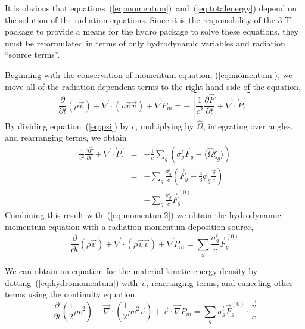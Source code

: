 \documentclass[12pt]{article}
\newcommand{\partl}[2]{\ensuremath{\frac{\partial{#1}}{\partial{#2}}}}\newcommand{\del}{\ensuremath{\vec{\nabla}}}
\newcommand{\tensor}[1]{\ensuremath{\stackrel{\leftrightarrow}{#1}}}
\begin{document}
It is obvious that equations~(\ref{eq:momentum})~and~(\ref{eq:totalenergy})
depend on the solution of the radiation equations.
Since it is the responsibility of the 3-T package to provide a means for
the hydro package to solve these equations, they must be reformulated
in terms of only hydrodynamic variables and radiation ``source terms''.

Beginning with the conservation of momentum equation, (\ref{eq:momentum}),
we move all of the radiation dependent terms to the right hand side of the
equation,
\begin{equation}
   \partl{}{t}\left( \rho \vec{v}\right)
      + \del \cdot \left( \rho \vec{v} \vec{v} \right)
      + \del P_{m}
   =
   - \left[ \frac{1}{c^2} \partl{\vec{F}}{t}
            + \del \cdot \tensor{P_{r}}
     \right]
\label{eq:momentum2}
\end{equation}
By dividing equation~(\ref{eq:psi}) by $c$, multiplying by $\hat{\Omega}$,
integrating over angles, and rearranging terms, we obtain
\begin{eqnarray}
   \frac{1}{c^2} \partl{\vec{F}}{t} + \del \cdot \tensor{P_{r}}
      &=& - \frac{1}{c} \sum_{g} \left( \sigma^{t}_{g} \vec{F}_{g}
                              - \langle \hat{\Omega} \xi_{g} \rangle \right)
         \\
      &=& - \sum_{g} \frac{\sigma^{t}_{g}}{c}
             \left( \vec{F}_{g} - \frac{4}{3} \phi_{g} \frac{\vec{v}}{c} \right)
         \\
      &=& - \sum_{g} \frac{\sigma^{t}_{g}}{c} \vec{F}^{(0)}_{g}
\end{eqnarray}
Combining this result with~(\ref{eq:momentum2}) we obtain the hydrodynamic
momentum equation with a radiation momentum deposition source,
\begin{equation}
 \boxed{
   \partl{}{t}\left( \rho \vec{v}\right)
      + \del \cdot \left( \rho \vec{v} \vec{v} \right)
      + \del P_{m}
   =
    \sum_{g} \frac{\sigma^{t}_{g}}{c} \vec{F}^{(0)}_{g}
 }
\label{eq:hydromomentum}
\end{equation}

We can obtain an equation for the material kinetic energy density by
dotting~(\ref{eq:hydromomentum}) with $\vec{v}$, rearranging terms, and
canceling other terms using the continuity equation,
\begin{equation}
     \partl{}{t} \left(\frac{1}{2} \rho v^2\right)
   + \del \cdot \left(\frac{1}{2} \rho v^2 \vec{v} \right)
   + \vec{v} \cdot \del P_{m}
   = \sum_{g} \sigma^{t}_{g} \vec{F}^{(0)}_{g} \cdot \frac{\vec{v}}{c}
\label{eq:hydrokinetic}
\end{equation}
\end{document}
